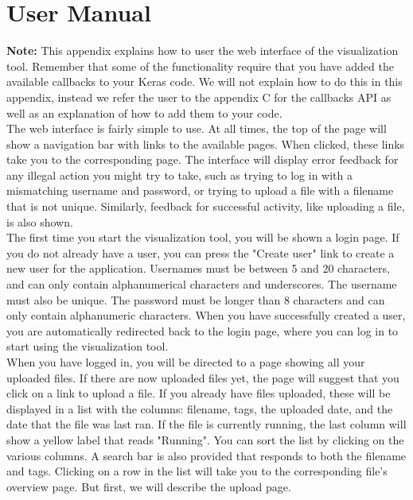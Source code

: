 \chapter{User Manual}

\textbf{Note:} This appendix explains how to user the web interface of the visualization tool. Remember that some of the functionality require that you have added the available callbacks to your Keras code. We will not explain how to do this in this appendix, instead we refer the user to the appendix C for the callbacks API as well as an explanation of how to add them to your code. \\

\noindent The web interface is fairly simple to use. At all times, the top of the page will show a navigation bar with links to the available pages. When clicked, these links take you to the corresponding page. The interface will display error feedback for any illegal action you might try to take, such as trying to log in with a mismatching username and password, or trying to upload a file with a filename that is not unique. Similarly, feedback for successful activity, like uploading a file, is also shown. \\


\noindent The first time you start the visualization tool, you will be shown a login page. If you do not already have a user, you can press the "Create user" link to create a new user for the application. Usernames must be between 5 and 20 characters, and can only contain alphanumerical characters and underscores. The username must also be unique. The password must be longer than 8 characters and can only contain alphanumeric characters. When you have successfully created a user, you are automatically redirected back to the login page, where you can log in to start using the visualization tool. \\


\noindent When you have logged in, you will be directed to a page showing all your uploaded files. If there are now uploaded files yet, the page will suggest that you click on a link to upload a file. If you already have files uploaded, these will be displayed in a list with the columns: filename, tags, the uploaded date, and the date that the file was last ran. If the file is currently running, the last column will show a yellow label that reads "Running". You can sort the list by clicking on the various columns. A search bar is also provided that responds to both the filename and tags. Clicking on a row in the list will take you to the corresponding file's overview page. But first, we will describe the upload page. \\

